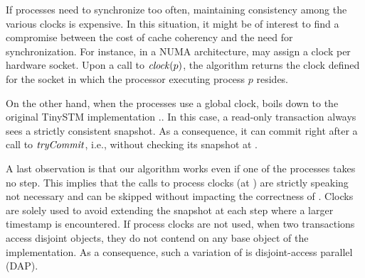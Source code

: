 If processes need to synchronize too often, maintaining consistency among the various clocks is expensive.
In this situation, it might be of interest to find a compromise between the cost of cache coherency and the need for synchronization.
For instance, in a NUMA architecture,  may assign a clock per hardware socket.
Upon a call to $\clockOf{p}$, the algorithm returns the clock defined for the socket in which the processor executing process $p$ resides.

On the other hand, when the processes use a global clock,  boils down to the original TinySTM implementation \cite{FelberFMR10}..
In this case, a read-only transaction always sees a strictly consistent snapshot.
As a consequence, it can commit right after a call to $\stmTryCommitFunction$, i.e., without checking its snapshot at .

A last observation is that our algorithm works even if one of the processes takes no step.
This implies that the calls to process clocks (at ) are strictly speaking not necessary and can be skipped without impacting the correctness of .
Clocks are solely used to avoid extending the snapshot at each step where a larger timestamp is encountered.
If process clocks are not used, when two transactions access disjoint objects, they do not contend on any base object of the implementation.
As a consequence, such a variation of  is disjoint-access parallel (DAP).
